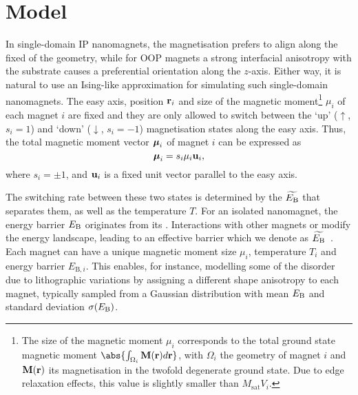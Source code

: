 \section{Model}
In single-domain IP nanomagnets, the magnetisation prefers to align along the fixed  of the geometry, while for OOP magnets a strong interfacial anisotropy with the substrate causes a preferential orientation along the $z$-axis.
Either way, it is natural to use an Ising-like approximation for simulating such single-domain nanomagnets.
The easy axis, position $\boldsymbol{\mathbf{r}}_i$ and size of the magnetic moment\footnote{
	\label{fn:2:moment_integral}
	The size of the magnetic moment $\mu_i$ corresponds to the total ground state magnetic moment $\abs{\int_{\Omega_i} \vc{M}(\vc{r})d\vc{r}}$, with $\Omega_i$ the geometry of magnet $i$ and $\boldsymbol{\mathbf{M}}(\boldsymbol{\mathbf{r}})$ its magnetisation in the twofold degenerate ground state.
	Due to edge relaxation effects, this value is slightly smaller than $M_\mathrm{sat} V_i$.
} $\mu_i$ of each magnet $i$ are fixed and they are only allowed to switch between the `up' ($\uparrow$, $s_i=1$) and `down' ($\downarrow$, $s_i=-1$) magnetisation states along the easy axis.
Thus, the total magnetic moment vector $\boldsymbol{\mathbf{\mu}}_i$ of magnet $i$ can be expressed as
\begin{equation}
	\boldsymbol{\mathbf{\mu}}_i = s_i \mu_i \boldsymbol{\mathbf{u}}_i \mathrm{,}
\end{equation}
where $s_i = \pm 1$, and $\boldsymbol{\mathbf{u}}_i$ is a fixed unit vector parallel to the easy axis. \par
The switching rate between these two states is determined by the  $\widetilde{E_\mathrm{B}}$ that separates them, as well as the temperature $T$.
For an isolated nanomagnet, the energy barrier $E_\mathrm{B}$ originates from its .
Interactions with other magnets or  modify the energy landscape, leading to an effective barrier which we denote as $\widetilde{E_\mathrm{B}}$~\cite{leo2021chiral}.
Each magnet can have a unique magnetic moment size $\mu_i$, temperature $T_i$ and energy barrier $E_{\mathrm{B},i}$.
This enables, for instance, modelling some of the disorder due to lithographic variations by assigning a different shape anisotropy to each magnet, typically sampled from a Gaussian distribution with mean $E_\mathrm{B}$ and standard deviation $\sigma(E_\mathrm{B})$.


